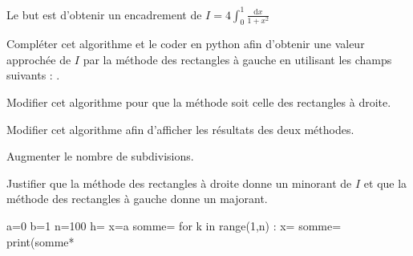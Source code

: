 Le but est d'obtenir un encadrement de
\quad $\displaystyle I=4\int_0^1\frac{\text{d}x}{1+x^2}$

\begin{minipage}[c]{.6\linewidth}
\question{}
Compléter cet algorithme et le coder en python afin d'obtenir une valeur approchée de $I$ par la méthode des rectangles à gauche en utilisant les champs suivants : 
.

\question{}
Modifier cet algorithme pour que la méthode soit celle des rectangles à droite.

\question{}
Modifier cet algorithme afin d'afficher les résultats des deux méthodes.

\question{}
Augmenter le nombre de subdivisions.

\question{}
Justifier que la méthode des rectangles à droite donne un minorant de $I$ et que la méthode des rectangles à gauche donne un majorant. 
\end{minipage} \hfill
\begin{minipage}[c]{.35\linewidth}
\begin{py}
\begin{python}
a=0
b=1
n=100
h=
x=a
somme=
for k in range(1,n) :
    x=
    somme=
print(somme* 
\end{python}
\end{py}
\end{minipage}